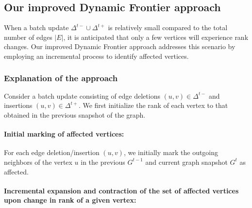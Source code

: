 

\subsection{Our improved Dynamic Frontier approach}
\label{sec:frontier}

When a batch update $\Delta^{t-} \cup \Delta^{t+}$ is relatively small compared to the total number of edges $|E|$, it is anticipated that only a few vertices will experience rank changes. Our improved Dynamic Frontier approach addresses this scenario by employing an incremental process to identify affected vertices.


\subsubsection{Explanation of the approach}
\label{sec:frontier-explanation}

Consider a batch update consisting of edge deletions $(u, v) \in \Delta^{t-}$ and insertions $(u, v) \in \Delta^{t+}$. We first initialize the rank of each vertex to that obtained in the previous snapshot of the graph.

\paragraph{Initial marking of affected vertices:}

For each edge deletion/insertion $(u, v)$, we initially mark the outgoing neighbors of the vertex $u$ in the previous $G^{t-1}$ and current graph snapshot $G^t$ as affected.

\paragraph{Incremental expansion and contraction of the set of affected vertices upon change in rank of a given vertex:}

